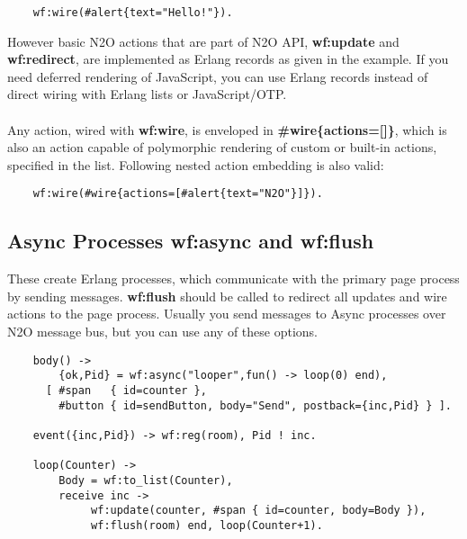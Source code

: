 \vspace{1\baselineskip}
\begin{lstlisting}
    wf:wire(#alert{text="Hello!"}).
\end{lstlisting}
\vspace{1\baselineskip}

However basic N2O actions that are part of N2O API, {\bf wf:update} and {\bf wf:redirect},
are implemented as Erlang records as given in the example. If you need deferred
rendering of JavaScript, you can use Erlang records instead of direct wiring with
Erlang lists or JavaScript/OTP.

\paragraph{}
Any action, wired with {\bf wf:wire}, is enveloped in {\bf \#wire\{actions=[]\}},
which is also an action capable of polymorphic rendering of custom or built-in actions, specified in the list.
Following nested action embedding is also valid:

\vspace{1\baselineskip}
\begin{lstlisting}
    wf:wire(#wire{actions=[#alert{text="N2O"}]}).
\end{lstlisting}
\vspace{1\baselineskip}

\subsection{Async Processes {\bf wf:async} and {\bf wf:flush}}
These create Erlang processes, which communicate with the primary page
process by sending messages. {\bf wf:flush} should be called to redirect all updates and
wire actions to the page process.
Usually you send messages to Async processes over N2O
message bus, but you can use any of these options.

\vspace{1\baselineskip}
\begin{lstlisting}
    body() ->
        {ok,Pid} = wf:async("looper",fun() -> loop(0) end),
      [ #span   { id=counter },
        #button { id=sendButton, body="Send", postback={inc,Pid} } ].

    event({inc,Pid}) -> wf:reg(room), Pid ! inc.

    loop(Counter) ->
        Body = wf:to_list(Counter),
        receive inc -> 
             wf:update(counter, #span { id=counter, body=Body }),
             wf:flush(room) end, loop(Counter+1).
\end{lstlisting}

